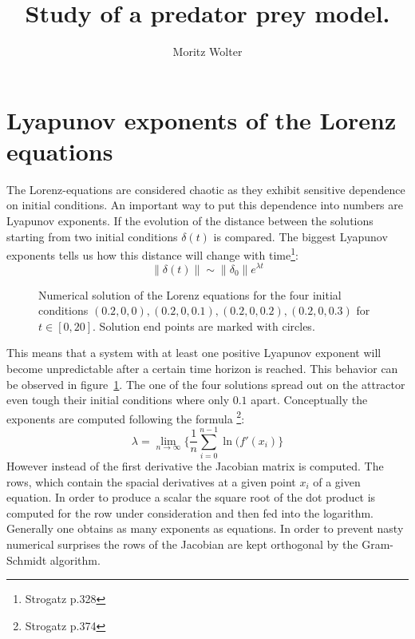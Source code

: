 




\title{Study of a predator prey model.}
\author{Moritz Wolter}

\maketitle

\section{Lyapunov exponents of the Lorenz equations}
The Lorenz-equations are considered chaotic as they exhibit sensitive dependence on initial conditions. An important way to put this dependence into numbers are Lyapunov exponents. If the evolution of the distance between the solutions starting from two initial conditions $\delta(t)$ is compared. The biggest Lyapunov exponents tells us how this distance will change with time\footnote{Strogatz p.328}:
\begin{equation}
\| \delta(t) \| \sim \| \delta_0 \| e^{\lambda t}
\end{equation} 
\begin{figure}
\centering

\caption{Numerical solution of the Lorenz equations for the four initial conditions $(0.2, 0, 0), (0.2, 0, 0.1), (0.2, 0, 0.2), (0.2, 0, 0.3)$ for $t \in [0, 20]$. Solution end points are marked with circles.}
\label{fig:lorenz4}
\end{figure}
This means that a system with at least one positive Lyapunov exponent will become unpredictable after a certain time horizon is reached. This behavior can be observed in figure~\ref{fig:lorenz4}. The one of the four solutions spread out on the attractor even tough their initial conditions where only $0.1$ apart.
Conceptually the exponents are computed following the formula \footnote{Strogatz p.374}:
\begin{equation}
\lambda = \lim_{n \rightarrow \infty}\{\frac{1}{n} \sum_{i=0}^{n-1}\ln(f'(x_i)\}
\end{equation}
However instead of the first derivative the Jacobian matrix is computed. The rows, which contain the spacial derivatives at a given point $x_i$ of a given equation. In order to produce a scalar the square root of the dot product is computed for the row under consideration and then fed into the logarithm. Generally one obtains as many exponents as equations. In order to prevent nasty numerical surprises the rows of the Jacobian are kept orthogonal by the Gram-Schmidt algorithm.


